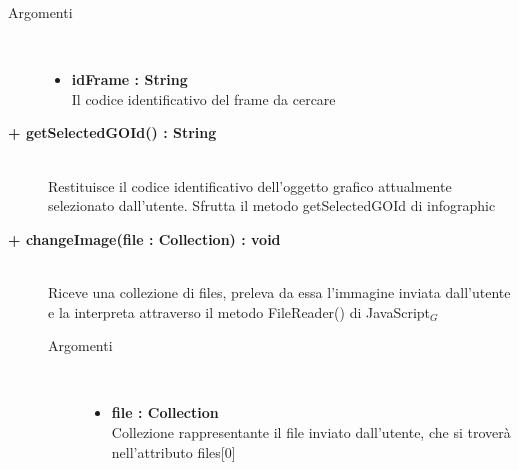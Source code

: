 \begin{description}
\begin{description}
		\begin{description}
			\item[Argomenti] \hfill \\
				\begin{itemize}
				
					\item \textbf{idFrame : String		} \hfill \\
					Il codice identificativo del frame da cercare
					
				\end{itemize}
			
		\end{description}
	\end{description}
	
	\begin{description}
		\item[\textbf{\color{blue}+ getSelectedGOId() : String		}] \hfill \\
			Restituisce il codice identificativo dell'oggetto grafico attualmente selezionato dall'utente. Sfrutta il metodo getSelectedGOId di infographic
			
	\end{description}
	
	\begin{description}
		\item[\textbf{\color{blue}+ changeImage(file : Collection) : void  	}] \hfill \\
			Riceve una collezione di files, preleva da essa l'immagine inviata dall'utente e la interpreta attraverso il metodo FileReader() di JavaScript$_G$
			
		\begin{description}
			\item[Argomenti] \hfill \\
				\begin{itemize}
				
					\item \textbf{file : Collection		} \hfill \\
					Collezione rappresentante il file inviato dall'utente, che si troverà nell'attributo files[0]					
				\end{itemize}
				
		\end{description}
	\end{description}
	

\end{description}
